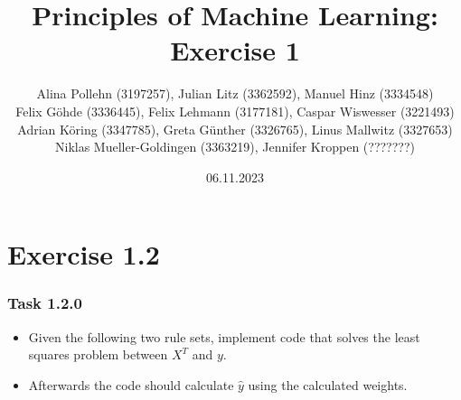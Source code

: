 \documentclass[10pt,aspectratio=169,handout]{beamer}
\begin{document}
\title{Principles of Machine Learning: Exercise 1}
\date{06.11.2023}
\author{Alina Pollehn (3197257), Julian Litz (3362592), Manuel Hinz (3334548)\\
    Felix Göhde (3336445), Felix Lehmann (3177181), Caspar Wiswesser (3221493)\\
    Adrian Köring (3347785), Greta Günther (3326765), Linus Mallwitz (3327653)\\
    Niklas Mueller-Goldingen (3363219), Jennifer Kroppen (???????)}

\begin{frame}
    \maketitle
\end{frame}

\section{Exercise 1.2}


\begin{frame}
    \frametitle{Task 1.2.0}
    \begin{itemize}
        \item Given the following two rule sets, implement code that solves the least squares problem between $X^T$ and $y$.
        \item Afterwards the code should calculate $\hat{y}$ using the calculated weights.
    \end{itemize}
\end{frame}
\end{document}
